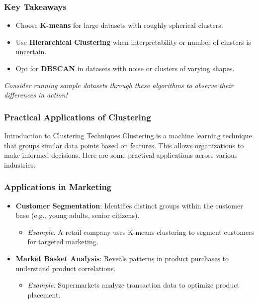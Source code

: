\documentclass[aspectratio=169]{beamer}
\begin{document}
\begin{frame}[fragile]
    \frametitle{Key Takeaways}
    \begin{itemize}
        \item Choose \textbf{K-means} for large datasets with roughly spherical clusters.
        \item Use \textbf{Hierarchical Clustering} when interpretability or number of clusters is uncertain.
        \item Opt for \textbf{DBSCAN} in datasets with noise or clusters of varying shapes.
    \end{itemize}
    \item[] \textit{Consider running sample datasets through these algorithms to observe their differences in action!}
\end{frame}

\begin{frame}[fragile]
    \frametitle{Practical Applications of Clustering}
    \begin{block}{Introduction to Clustering Techniques}
        Clustering is a machine learning technique that groups similar data points based on features. This allows organizations to make informed decisions. Here are some practical applications across various industries:
    \end{block}
\end{frame}

\begin{frame}[fragile]
    \frametitle{Applications in Marketing}
    \begin{itemize}
        \item \textbf{Customer Segmentation}: Identifies distinct groups within the customer base (e.g., young adults, senior citizens).
        \begin{itemize}
            \item \textit{Example:} A retail company uses K-means clustering to segment customers for targeted marketing.
        \end{itemize}
        \item \textbf{Market Basket Analysis}: Reveals patterns in product purchases to understand product correlations.
        \begin{itemize}
            \item \textit{Example:} Supermarkets analyze transaction data to optimize product placement.
        \end{itemize}
    \end{itemize}
\end{frame}
\end{document}

